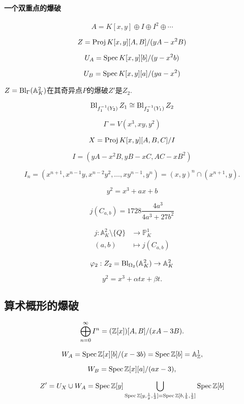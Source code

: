 \paragraph*{一个双重点的爆破}

\[
	A=K[x,y]\oplus I\oplus I^2\oplus \cdots
\]

\[
	Z=\operatorname{Proj} K[x,y][A,B]/(yA-x^2B)
\]

\[
	U_A=\operatorname{Spec} K[x,y][b]/(y-x^2b)
\]

\[
	U_B=\operatorname{Spec} K[x,y][a]/(ya-x^2)
\]

\begin{pro}\label{pro:4.40}
	$Z=\operatorname{Bl}_\Gamma(\mathbb A_K^2)$在其奇异点$P$的爆破$Z'$是$Z_2$.
\end{pro}


\[
	\operatorname{Bl}_{f_1^{-1}(Y_2)}Z_1 \cong \operatorname{Bl}_{f_2^{-1}(Y_1)}Z_2
\]

\[
	\Gamma=V(x^3,xy,y^2)
\]

\[
	X=\operatorname{Proj} K[x,y][A,B,C]/I
\]

\[
	I=(yA-x^2B,yB-xC,AC-xB^2)
\]

\[
	I_n=(x^{n+1},x^{n-1}y,x^{n-2}y^2,\dots,xy^{n-1},y^n)=
	(x,y)^n\cap (x^{n+1},y).
\]

\[
	y^2=x^3+ax+b
\]

\[
	j(C_{a,b})=1728\frac{4a^3}{4a^3+27b^2}
\]

\[
	\begin{aligned}
		j:\mathbb A_K^2\setminus \{Q\}&\longrightarrow \mathbb P_K^1 \\
		(a,b)&\longmapsto j(C_{a,b})
	\end{aligned}
\]

\[
	\varphi_2:Z_2=\operatorname{Bl}_{\Omega_2}(\mathbb A_K^2)\to \mathbb A_K^2
\]

\[
	y^2=x^3+\alpha tx+\beta t.
\]

\subsection{算术概形的爆破}\label{s:4.2.4}

\[
	\bigoplus_{n=0}^\infty I^n=(\mathbb{Z}[x])[A,B]/(xA-3B).
\]

\[
	W_A=\operatorname{Spec} \mathbb{Z}[x][b]/(x-3b)=\operatorname{Spec} \mathbb{Z}[b]=\mathbb A_{\mathbb{Z}}^1,
\]

\[
	W_B=\operatorname{Spec} \mathbb{Z}[x][a]/(ax-3),
\]

\[
	Z'=U_X\cup W_A=\operatorname{Spec} \mathbb{Z}[y]\bigcup_{\operatorname{Spec} \mathbb{Z}[y,\frac 1y,\frac 13]=\operatorname{Spec} \mathbb{Z}[b,\frac 1b,\frac 13]}\operatorname{Spec} \mathbb{Z}[b]
\]


